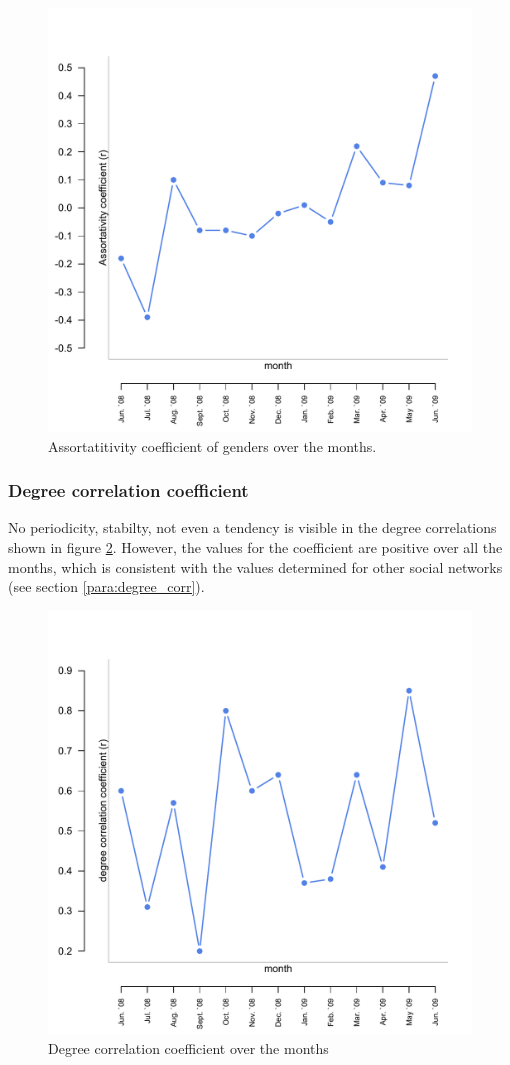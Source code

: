 \begin{figure}[htpb]
\begin{center}
  \includegraphics[width=.6\textwidth]{assets/pdf/long_gender_corr.pdf}
  \caption[Assortatitivity coefficient of genders over the monts]{Assortatitivity coefficient of genders over the months.}
  \label{fig:long_gender_corr}
\end{center}
\end{figure} 


\subsubsection{Degree correlation coefficient}

No periodicity, stabilty, not even a tendency is visible in the degree correlations shown in figure \ref{fig:long_degree_cor}. However, the values for the coefficient are positive over all the months, which is consistent with the values determined for other social networks (see section \ref{para:degree_corr}). 

\begin{figure}[htpb]
\begin{center}
  \includegraphics[width=.6\textwidth]{assets/pdf/long_degree_corr.pdf}
  \caption[Degree correlation coefficient over the months]{Degree correlation coefficient over the months}
  \label{fig:long_degree_cor}
\end{center}
\end{figure} 


